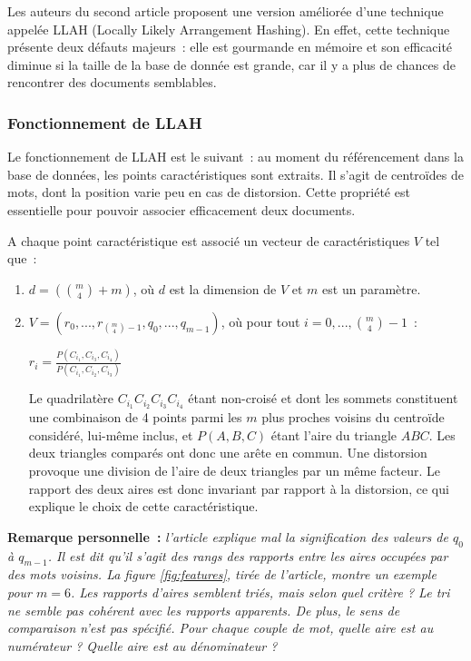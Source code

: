 \documentclass[a4paper]{article}
\begin{document}
Les auteurs du second article proposent une version améliorée d'une technique appelée LLAH (Locally Likely Arrangement Hashing). En effet, cette technique présente deux défauts majeurs~: elle est gourmande en mémoire et son efficacité diminue si la taille de la base de donnée est grande, car il y a plus de chances de rencontrer des documents semblables.

\subsubsection{Fonctionnement de LLAH}
Le fonctionnement de LLAH est le suivant~: au moment du référencement dans la base de données, les points caractéristiques sont extraits. Il s'agit de centroïdes de mots, dont la position varie peu en cas de distorsion. Cette propriété est essentielle pour pouvoir associer efficacement deux documents.

A chaque point caractéristique est associé un vecteur de caractéristiques $V$ tel que~:
\begin{enumerate}
	\item $d = ({m\choose 4} + m)$, où $d$ est la dimension de $V$ et $m$ est un paramètre.
	\item $V = (r_0, ..., r_{{m\choose 4}-1}, q_0, ..., q_{m-1})$, où pour tout $i = 0, ..., {m\choose 4}-1$~:
	
	$r_i = \frac{P(C_{i_1}, C_{i_3}, C_{i_4})}{P(C_{i_1}, C_{i_2}, C_{i_3})}$
	
	Le quadrilatère $C_{i_1}C_{i_2}C_{i_3}C_{i_4}$ étant non-croisé et dont les sommets constituent une combinaison de 4 points parmi les $m$ plus proches voisins du centroïde considéré, lui-même inclus, et $P(A,B,C)$ étant l'aire du triangle $ABC$. Les deux triangles comparés ont donc une arête en commun. Une distorsion provoque une division de l'aire de deux triangles par un même facteur. Le rapport des deux aires est donc invariant par rapport à la distorsion, ce qui explique le choix de cette caractéristique.
\end{enumerate}

\textbf{Remarque personnelle~:} \textit{l'article explique mal la signification des valeurs de $q_0$ à $q_{m-1}$. Il est dit qu'il s'agit des rangs des rapports entre les aires occupées par des mots voisins. La figure \ref{fig:features}, tirée de l'article, montre un exemple pour $m = 6$. Les rapports d'aires semblent triés, mais selon quel critère ? Le tri ne semble pas cohérent avec les rapports apparents. De plus, le sens de comparaison n'est pas spécifié. Pour chaque couple de mot, quelle aire est au numérateur ? Quelle aire est au dénominateur ?}
\end{document}
